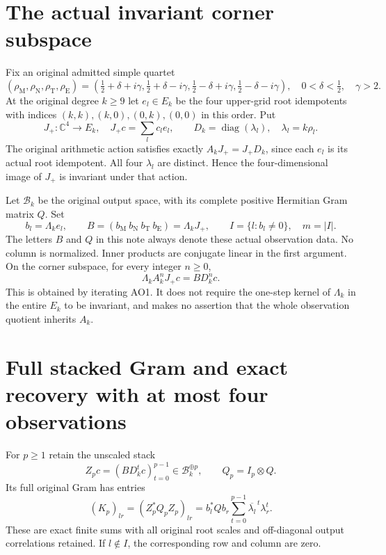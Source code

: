 \documentclass[11pt]{article}
\newcommand{\C}{\mathbb C}
\newcommand{\diag}{\operatorname{diag}}
\begin{document}
\section{The actual invariant corner subspace}
Fix an original admitted simple quartet
\[
 (\rho_{\mathrm M},\rho_{\mathrm N},\rho_{\mathrm T},\rho_{\mathrm E})
 =\left(\tfrac12+\delta+i\gamma,\tfrac12+\delta-i\gamma,
        \tfrac12-\delta+i\gamma,\tfrac12-\delta-i\gamma\right),
 \quad 0<\delta<\tfrac12,\quad\gamma>2.
\]
At the original degree $k\ge9$ let $e_l\in E_k$ be the four
upper-grid root idempotents with indices
$(k,k),(k,0),(0,k),(0,0)$ in this order. Put
\begin{equation}
 J_+:\C^4\longrightarrow E_k,\quad J_+c=\sum_lc_le_l,
 \qquad D_k=\diag(\lambda_l),\quad\lambda_l=k\rho_l.
 \tag{AO1}
\end{equation}
The original arithmetic action satisfies exactly
$A_kJ_+=J_+D_k$, since each $e_l$ is its actual root idempotent.
All four $\lambda_l$ are distinct. Hence the four-dimensional
image of $J_+$ is invariant under that action.

Let $\mathcal B_k$ be the original output space, with its
complete positive Hermitian Gram matrix $Q$. Set
\begin{equation}
 b_l=\Lambda_k e_l,\qquad
 B=(b_{\mathrm M}\ b_{\mathrm N}\ b_{\mathrm T}\ b_{\mathrm E})
       =\Lambda_kJ_+,
 \qquad I=\{l:b_l\ne0\},\quad m=|I|.
 \tag{AO2}
\end{equation}
The letters $B$ and $Q$ in this note always denote these
actual observation data. No column is normalized. Inner
products are conjugate linear in the first argument.
On the corner subspace, for every integer $n\ge0$,
\begin{equation}
 \Lambda_k A_k^nJ_+c=B D_k^n c.\tag{AO3}
\end{equation}
This is obtained by iterating AO1. It does not require the
one-step kernel of $\Lambda_k$ in the entire $E_k$ to be invariant,
and makes no assertion that the whole observation quotient
inherits $A_k$.

\section{Full stacked Gram and exact recovery with at most four observations}
For $p\ge1$ retain the unscaled stack
\begin{equation}
 Z_p c=(BD_k^t c)_{t=0}^{p-1}\in\mathcal B_k^{\oplus p},
 \qquad Q_p=I_p\otimes Q.
 \tag{AO4}
\end{equation}
Its full original Gram has entries
\begin{equation}
 (K_p)_{lr}=(Z_p^*Q_pZ_p)_{lr}
   =b_l^*Qb_r\sum_{t=0}^{p-1}\overline{\lambda_l}^{\,t}\lambda_r^t.
 \tag{AO5}
\end{equation}
These are exact finite sums with all original root scales and
off-diagonal output correlations retained. If $l\notin I$,
the corresponding row and column are zero.
\end{document}
